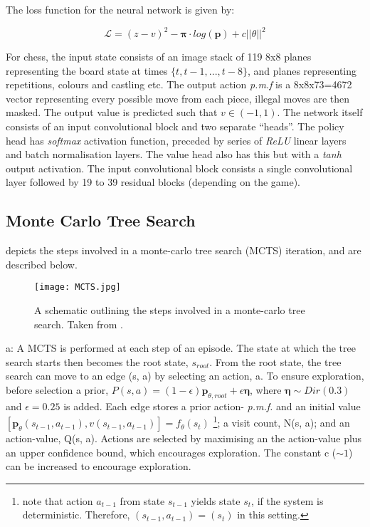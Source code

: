\documentclass[../main.tex]{subfiles}
\begin{document}
The loss function for the neural network is given by:

\begin{equation}
    \mathcal{L} = (z - v)^2 - \boldsymbol{\pi} \cdot log(\boldsymbol{p}) + c||\theta||^2
   \label{eqn:loss}
\end{equation}

For chess, the input state consists of an image stack of 119 8x8 planes representing the board state at times $ \{ t, t-1, ..., t-8 \} $, and planes representing repetitions, colours and castling etc. The output action \textit{p.m.f} is a 8x8x73=4672 vector representing every possible move from each piece, illegal moves are then masked. The output value is predicted such that $v \in (-1, 1)$. 
The network itself consists of an input convolutional block and two separate ``heads''. The policy head has \textit{softmax} activation function, preceded by series of \textit{ReLU} linear layers and batch normalisation layers. The value head also has this but with a \textit{tanh} output activation. The input convolutional block consists a single convolutional layer followed by 19 to 39 residual blocks (depending on the game).

\subsection{Monte Carlo Tree Search}
\label{sec:mctsintro}
 depicts the steps involved in a monte-carlo tree search (MCTS) iteration, and are described below.

\begin{figure}[H]
   \centering
   \texttt{[image: MCTS.jpg]}
   \caption{\label{fig:MCTS} A schematic outlining the steps involved in a monte-carlo tree search. Taken from \cite{AlphaGoZero}.}
\end{figure}

a:
A MCTS is performed at each step of an episode. The state at which the tree search starts then becomes the root state, $s_{root}$. From the root state, the tree search can move to an edge (s, a) by selecting an action, a. To ensure exploration, before selection a prior, $P(s, a) = (1-\epsilon)\boldsymbol{p}_{\theta, root} + \epsilon \boldsymbol{\eta}$, where $\boldsymbol{\eta} \sim Dir(0.3)$ and $\epsilon = 0.25$ is added. Each edge stores a prior action- \textit{p.m.f.} and an initial value $[\boldsymbol{p}_\theta (s_{t-1}, a_{t-1}), v(s_{t-1}, a_{t-1})] =f_\theta(s_t)$ \footnote{note that action $a_{t-1}$ from state $s_{t-1}$ yields state $s_t$, if the system is deterministic. Therefore, $(s_{t-1}, a_{t-1}) = (s_t)$ in this setting.}; a visit count, N(s, a); and an action-value, Q(s, a). Actions are selected by maximising an the action-value plus an upper confidence bound, which encourages exploration. The constant c ($\sim 1$) can be increased to encourage exploration.
\end{document}
